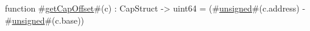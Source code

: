 function #\hyperref[zgetCapOffset]{getCapOffset}#(c) : CapStruct -> uint64 = (#\hyperref[zunsigned]{unsigned}#(c.address) - #\hyperref[zunsigned]{unsigned}#(c.base)) %
